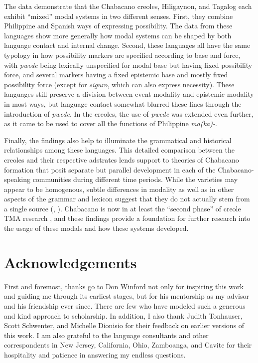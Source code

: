 \documentclass[output=paper,colorlinks,citecolor=brown]{langscibook}
\begin{document}
The data demonstrate that the Chabacano creoles, Hiligaynon, and Tagalog each exhibit “mixed” modal systems in two different senses. First, they combine Philippine and Spanish ways of expressing possibility. The data from these languages show more generally how modal systems can be shaped by both language contact and internal change. Second, these languages all have the same typology in how possibility markers are specified according to base and force, with \textit{pwede} being lexically unspecified for modal base but having fixed possibility force, and several markers having a fixed epistemic base and mostly fixed possibility force (except for \textit{siguro}, which can also express necessity). These languages still preserve a division between event modality and epistemic modality in most ways, but language contact somewhat blurred these lines through the introduction of \textit{pwede}. In the creoles, the use of \textit{pwede} was extended even further, as it came to be used to cover all the functions of Philippine \textit{ma(ka)-}.

Finally, the findings also help to illuminate the grammatical and historical relationships among these languages. This detailed comparison between the creoles and their respective adstrates lends support to theories of Chabacano formation that posit separate but parallel development in each of the Chabacano-speaking communities during different time periods. While the varieties may appear to be homogenous, subtle differences in modality as well as in other aspects of the grammar and lexicon suggest that they do not actually stem from a single source (\citealt{LeshoSippola2014}, \citealt{SippolaLesho2020}). Chabacano is now in at least the “second phase” of creole TMA research \citep{Winford2018}, and these findings provide a foundation for further research into the usage of these modals and how these systems developed.

\section*{Acknowledgements}

First and foremost, thanks go to Don Winford not only for inspiring this work and guiding me through its earliest stages, but for his mentorship as my advisor and his friendship ever since. There are few who have modeled such a generous and kind approach to scholarship. In addition, I also thank Judith Tonhauser, Scott Schwenter, and Michelle Dionisio for their feedback on earlier versions of this work. I am also grateful to the language consultants and other correspondents in New Jersey, California, Ohio, Zamboanga, and Cavite for their hospitality and patience in answering my endless questions. 
\end{document}

